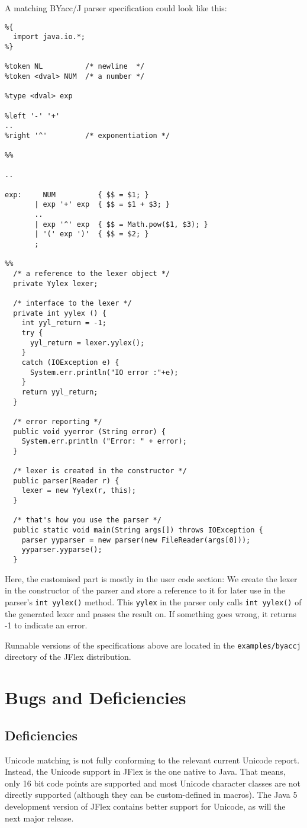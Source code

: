 \documentclass[11pt]{scrartcl}
\newcommand{\xsmall}{}
\begin{document}
A matching BYacc/J parser specification could look like this:
{\xsmall\begin{verbatim}
%{
  import java.io.*;
%}
      
%token NL          /* newline  */
%token <dval> NUM  /* a number */

%type <dval> exp

%left '-' '+'
..
%right '^'         /* exponentiation */
      
%%

..
      
exp:     NUM          { $$ = $1; }
       | exp '+' exp  { $$ = $1 + $3; }
       ..
       | exp '^' exp  { $$ = Math.pow($1, $3); }
       | '(' exp ')'  { $$ = $2; }
       ;

%%
  /* a reference to the lexer object */
  private Yylex lexer;

  /* interface to the lexer */
  private int yylex () {
    int yyl_return = -1;
    try {
      yyl_return = lexer.yylex();
    }
    catch (IOException e) {
      System.err.println("IO error :"+e);
    }
    return yyl_return;
  }

  /* error reporting */
  public void yyerror (String error) {
    System.err.println ("Error: " + error);
  }

  /* lexer is created in the constructor */
  public parser(Reader r) {
    lexer = new Yylex(r, this);
  }

  /* that's how you use the parser */
  public static void main(String args[]) throws IOException {
    parser yyparser = new parser(new FileReader(args[0]));
    yyparser.yyparse();    
  }
\end{verbatim}
}

Here, the customised part is mostly in the user code section:
We create the lexer in the constructor of the parser and store
a reference to it for later use in the parser's \texttt{int yylex()}
method. This \texttt{yylex} in the parser only calls \texttt{int yylex()}
of the generated lexer and passes the result on. If something goes
wrong, it returns -1 to indicate an error.

Runnable versions of the specifications above 
are located in the \texttt{examples/byaccj} directory of the JFlex 
distribution.

\section{Bugs and Deficiencies\label{Bugs}}

\subsection{Deficiencies}
Unicode matching is not fully conforming to the relevant current Unicode report. Instead, the Unicode support in JFlex is the one native to Java. That means, only 16 bit code points are supported and most Unicode character classes are not directly supported (although they can be custom-defined in macros). The Java 5 development version of JFlex contains better support for Unicode, as will the next major release.
\end{document}
